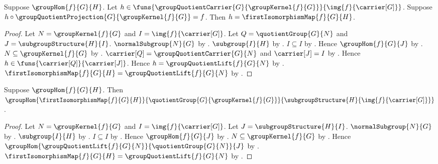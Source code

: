 \begin{theorem}\label{first_isomorphism_map_unique}
    Suppose $\groupHom{f}{G}{H}$.
    Let
        $h\in
            \funs{
                \groupQuotientCarrier{G}{\groupKernel{f}{G}}}
                {\img{f}{\carrier[G]}}$.
    Suppose
        $h\circ
            \groupQuotientProjection
                {G}{\groupKernel{f}{G}}=f$.
    Then $h=\firstIsomorphismMap{f}{G}{H}$.
\end{theorem}
\begin{proof}
    Let $N=\groupKernel{f}{G}$ and
        $I=\img{f}{\carrier[G]}$.
    Let $Q=\quotientGroup{G}{N}$ and
        $J=\subgroupStructure{H}{I}$.
    $\normalSubgroup{N}{G}$ by .
    $\subgroup{I}{H}$ by .
    $I\subseteq I$ by .
    Hence $\groupHom{f}{G}{J}$ by
        .
    $N\subseteq\groupKernel{f}{G}$ by .
    $\carrier[Q]=\groupQuotientCarrier{G}{N}$ and
        $\carrier[J]=I$ by
        .
    Hence $h\in\funs{\carrier[Q]}{\carrier[J]}$.
    Hence $h=\groupQuotientLift{f}{G}{N}$ by
        .
    $\firstIsomorphismMap{f}{G}{H}=
        \groupQuotientLift{f}{G}{N}$ by
        .
\end{proof}

\begin{theorem}\label{first_isomorphism_map_hom}
    Suppose $\groupHom{f}{G}{H}$.
    Then
        $\groupHom
            {\firstIsomorphismMap{f}{G}{H}}
            {\quotientGroup{G}{\groupKernel{f}{G}}}
            {\subgroupStructure{H}{\img{f}{\carrier[G]}}}$.
\end{theorem}
\begin{proof}
    Let $N=\groupKernel{f}{G}$ and
        $I=\img{f}{\carrier[G]}$.
    Let $J=\subgroupStructure{H}{I}$.
    $\normalSubgroup{N}{G}$ by .
    $\subgroup{I}{H}$ by .
    $I\subseteq I$ by .
    Hence $\groupHom{f}{G}{J}$ by
        .
    $N\subseteq\groupKernel{f}{G}$ by .
    Hence
        $\groupHom
            {\groupQuotientLift{f}{G}{N}}
            {\quotientGroup{G}{N}}{J}$ by
        .
    $\firstIsomorphismMap{f}{G}{H}=
        \groupQuotientLift{f}{G}{N}$ by
        .
\end{proof}

